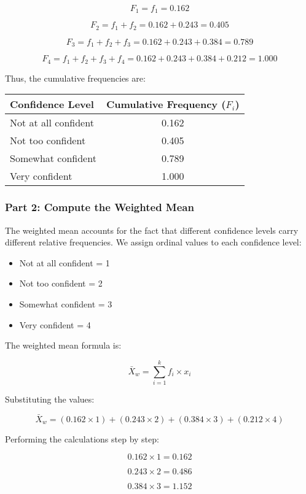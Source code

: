 \documentclass{article}
\begin{document}
\[
F_1 = f_1 = 0.162
\]

\[
F_2 = f_1 + f_2 = 0.162 + 0.243 = 0.405
\]

\[
F_3 = f_1 + f_2 + f_3 = 0.162 + 0.243 + 0.384 = 0.789
\]

\[
F_4 = f_1 + f_2 + f_3 + f_4 = 0.162 + 0.243 + 0.384 + 0.212 = 1.000
\]

Thus, the cumulative frequencies are:

\begin{center}
\begin{tabular}{|l|c|}
\hline
\textbf{Confidence Level} & \textbf{Cumulative Frequency} (\(F_i\)) \\
\hline
Not at all confident & 0.162 \\
Not too confident & 0.405 \\
Somewhat confident & 0.789 \\
Very confident & 1.000 \\
\hline
\end{tabular}
\end{center}

\subsubsection*{Part 2: Compute the Weighted Mean}

The weighted mean accounts for the fact that different confidence levels carry different relative frequencies. We assign ordinal values to each confidence level:
\begin{itemize}
    \item Not at all confident = 1
    \item Not too confident = 2
    \item Somewhat confident = 3
    \item Very confident = 4
\end{itemize}

The weighted mean formula is:

\[
\bar{X}_w = \sum_{i=1}^{k} f_i \times x_i
\]

Substituting the values:

\[
\bar{X}_w = (0.162 \times 1) + (0.243 \times 2) + (0.384 \times 3) + (0.212 \times 4)
\]

Performing the calculations step by step:

\[
0.162 \times 1 = 0.162
\]

\[
0.243 \times 2 = 0.486
\]

\[
0.384 \times 3 = 1.152
\]
\end{document}
